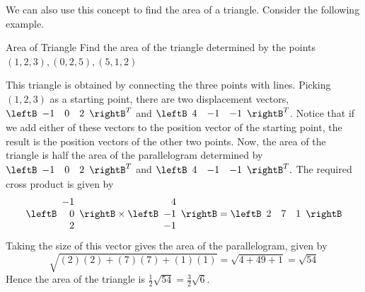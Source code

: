 We can also use this concept to find the area of a triangle. Consider the following
example.

\begin{example}{Area of Triangle}\label{exa:areatriangle}
Find the area of the triangle determined by the points $\left(1, 2, 3 \right) ,
\left( 0,2,5\right),
\left( 5,1, 2 \right) $ 
\end{example}

\begin{solution}
This triangle is obtained by connecting the three points with lines. Picking
$\left( 1,2,3\right) $ as a starting point, there are two displacement
vectors, $\leftB 
\begin{array}{rrr}
-1 & 0 & 2
\end{array}
\rightB^T $ and $\leftB 
\begin{array}{rrr}
4 & -1 & -1
\end{array}
\rightB^T $. Notice that if we add either of these vectors to the position vector of the 
starting point, the result is the position vectors of the other two
points. Now, the area of the triangle is half the area of the parallelogram
determined by $\leftB 
\begin{array}{rrr}
-1 & 0 & 2
\end{array}
\rightB^T $ and $\leftB 
\begin{array}{rrr}
4 & -1 & -1
\end{array}
\rightB^T.$ 
The required cross product is given by
\begin{equation*}
\leftB 
\begin{array}{r}
-1 \\
0 \\
2
\end{array}
\rightB \times \leftB 
\begin{array}{r}
4 \\
-1 \\
-1
\end{array}
\rightB = \leftB
\begin{array}{rrr}
2 & 7 & 1
\end{array}
\rightB 
\end{equation*}
  Taking the size of this vector gives the area of the parallelogram,
given by 
\begin{equation*}
\sqrt{(2)(2) + (7)(7) + (1)(1)}
=
\sqrt{4+49+1}
= \sqrt{54}
\end{equation*}
Hence the area of the triangle is $\frac{1}{2}\sqrt{54}= \frac{3}{2}\sqrt{6}.$
\end{solution}

